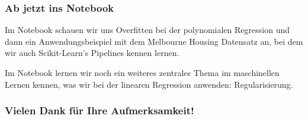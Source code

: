 \begin{frame}
  \frametitle{Ab jetzt ins Notebook}
  Im Notebook schauen wir uns \alert{Overfitten bei der polynomialen Regression} und dann ein \alert{Anwendungsbeispiel} mit dem Melbourne Housing Datensatz an, bei dem wir auch Scikit-Learn's \alert{Pipelines} kennen lernen.

  Im Notebook lernen wir noch ein weiteres zentrales Thema im maschinellen Lernen kennen, was wir bei der linearen Regression anwenden: \alert{Regularisierung}.

  \vspace{1cm}
  
\end{frame}


\begin{frame}[separator]
  \frametitle{Vielen Dank für Ihre Aufmerksamkeit!}
\end{frame}



